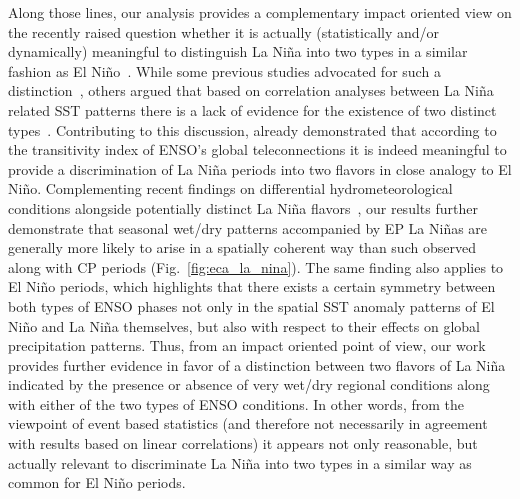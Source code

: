 \documentclass[utf8]{frontiersSCNS} %
\begin{document}
Along those lines, our analysis provides a complementary impact oriented view on the recently raised question whether it is actually (statistically and/or dynamically) meaningful to distinguish La Ni\~na into two types in a similar fashion as El Ni\~no~\citep{kug_are_2011}. While some previous studies advocated for such a distinction~\citep{kao_contrasting_2009,ashok_climate_2009}, others argued that based on correlation analyses between La Ni\~na related SST patterns there is a lack of evidence for the existence of two distinct types~\citep{kug_two_2009,ren_nino_2011}. Contributing to this discussion, \cite{wiedermann_climate_2016} already demonstrated that according to the transitivity index of ENSO's global teleconnections it is indeed meaningful to provide a discrimination of La Ni\~na periods into two flavors in close analogy to El Ni\~no. Complementing recent findings on  differential hydrometeorological conditions alongside potentially distinct La Ni\~na flavors~\citep{hidayat2018impact, magee2017influence, song2017distinct, shinoda2011anomalous}, our results further demonstrate that seasonal wet/dry patterns accompanied by EP La Ni\~nas are generally more likely to arise in a spatially coherent way than such observed along with CP periods (Fig.~\ref{fig:eca_la_nina}). The same finding also applies to El Ni\~no periods, which highlights that there exists a certain symmetry between both types of ENSO phases not only in the spatial SST anomaly patterns of El Ni\~no and La Ni\~na themselves, but also with respect to their effects on global precipitation patterns. Thus, from an impact oriented point of view, our work provides further evidence in favor of a distinction between two flavors of La Ni\~na indicated by the presence or absence of very wet/dry regional conditions along with either of the two types of ENSO conditions. In other words, from the viewpoint of event based statistics (and therefore not necessarily in agreement with results based on linear correlations) it appears not only reasonable, but actually relevant to discriminate La Ni\~na into two types in a similar way as common for El Ni\~no periods.
\end{document}
